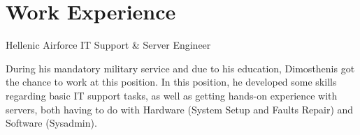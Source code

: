 \documentclass[%
               doublesided,
               paper=a4,
               fontsize=10pt
              ]{my-resume}
\begin{document}
{    \section[\faGears]{Work Experience}
        {Hellenic Airforce}
        {IT Support \& Server Engineer}
        
        During his mandatory military service and due to his education, Dimosthenis got the chance to work at this position. In this position, he developed some skills regarding basic IT support tasks, as well as getting hands-on experience with servers, both having to do with Hardware (System Setup and Faults Repair) and Software (Sysadmin).
    

\iffalse

    \section{Achievements, honours and awards}
    \achievement{My first achievement}
    \achievement{My second achievement}

    \section{General Skills}
    \smallskip %
    \tag{Tag 1}
    \tag{Tag 2}
    \tag{and}
    \tag{another tag}
    \tag{some more tags}
    \tag{yet another one}
    \tag{tags flow over}
    \tag{to the next line}
    \tag{if necessary}
    
    \medskip
    Tags must be ordered by hand with newlines to get a nice layout, especially for long tags.
    
    \section{Wheel Chart}
    \wheelchart{1.5cm}{0.5cm}{%
        6/8em/accent!20/Sleep,          %
        8/8em/accent!40/Daytime job,    %
        2/8em/accent!80/Training,          %
        3/8em/accent!60/Recovering from fighting criminals,
        5/8em/accent/Being Batman
    }
\fi
}
\makebody
\clearpage
\end{document}
